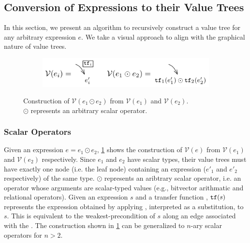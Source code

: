 \subsection{Conversion of Expressions to their Value Trees}
\label{sec:valuetreeconv}
In this section, we present an algorithm to recursively construct a value tree for any arbitrary expression $e$.
We take a visual approach to align with the graphical nature of value trees.

\begin{figure}[H]
\begin{subfigure}[b]{\textwidth}
\begin{center}
\includegraphics[scale=1.3]{chapters/figures/figValueTreeConvScalar.pdf}
\end{center}
\end{subfigure}
\caption{\label{fig:valuetreeconvscalar} Construction of $\mathcal{V}(e_1 \odot e_2)$ from $\mathcal{V}(e_1)$ and $\mathcal{V}(e_2)$.\\
$\odot$ represents an arbitrary scalar operator.}
\end{figure}

\subsubsection{Scalar Operators}
Given an expression $e = e_1 \odot e_2$,
\cref{fig:valuetreeconvscalar} shows the construction of $\mathcal{V}(e)$
from $\mathcal{V}(e_1)$ and $\mathcal{V}(e_2)$ respectively.
Since $e_1$ and $e_2$ have scalar types, their value trees must have exactly one
node (i.e. the leaf node) containing an expression ($e'_1$ and $e'_2$ respectively) of the same type.
$\odot$ represents an aribtrary scalar operator, i.e. an operator whose arguments
are scalar-typed values (e.g., bitvector arithmatic and relational operators).
Given an expression $s$ and a transfer function \xfer{}, ${\tt tf}{}(s)$
represents the expression obtained by applying \xfer{}, interpreted as a substitution,
to $s$. This is equivalent to the weakest-precondition of $s$ along an edge associated
with the \xfer{}.
The construction shown in \cref{fig:valuetreeconvscalar} can be generalized to
$n$-ary scalar operators for $n>2$.

